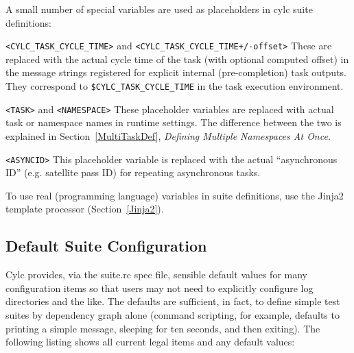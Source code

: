 A small number of special variables are used as placeholders in cylc suite definitions:

\begin{myitemize}
    \item \lstinline=<CYLC_TASK_CYCLE_TIME>= and
        \lstinline=<CYLC_TASK_CYCLE_TIME+/-offset>= \newline
        These are replaced with the actual cycle time of the task (with
        optional computed offset) in the message strings registered for
        explicit internal (pre-completion) task outputs. They correspond to 
        \lstinline=$CYLC_TASK_CYCLE_TIME= in the task execution environment.

    \item \lstinline=<TASK>= and \lstinline=<NAMESPACE>= \newline
        These placeholder variables are replaced with actual task or
        namespace names in runtime settings. The difference between 
        the two is explained in Section~\ref{MultiTaskDef}, 
        {\em Defining Multiple Namespaces At Once}.

    \item \lstinline=<ASYNCID>=\newline
        This placeholder variable is replaced with the actual ``asynchronous
        ID'' (e.g. satellite pass ID) for repeating asynchronous tasks.
\end{myitemize}

To use real (programming language) variables in suite definitions, use the 
Jinja2 template processor (Section~\ref{Jinja2}).


\subsection{Default Suite Configuration}
\label{SuiteDefaults}

Cylc provides, via the suite.rc spec file, sensible default values for
many configuration items so that users may not need to explicitly
configure log directories and the like. The defaults are sufficient, in
fact, to define simple test suites by dependency graph alone
(command scripting, for example, defaults to printing a
simple message, sleeping for ten seconds, and then exiting). The
following listing shows all current legal items and any default values:

\lstset{language=suiterc}

\lstset{language=transcript}
